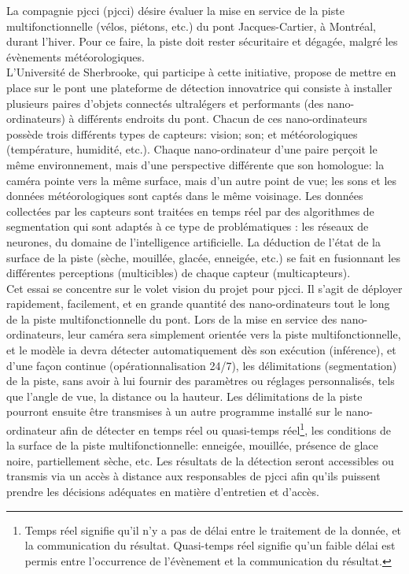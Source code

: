 ﻿\noindent La compagnie \acrlong{pjcci} (\acrshort{pjcci}) désire évaluer la mise en service de la piste multifonctionnelle (vélos, piétons, etc.) du pont Jacques-Cartier, à Montréal, durant l'hiver. Pour ce faire, la piste doit rester sécuritaire et dégagée, malgré les évènements météorologiques.
\vspace{0.5\baselineskip}
\\
\noindent L'Université de Sherbrooke, qui participe à cette initiative, propose de mettre en place sur le pont une plateforme de détection innovatrice qui consiste à installer plusieurs paires d'objets connectés ultralégers et performants (des nano-ordinateurs) à différents endroits du pont. Chacun de ces nano-ordinateurs possède trois différents types de capteurs: vision; son; et météorologiques (température, humidité, etc.). Chaque nano-ordinateur d'une paire perçoit le même environnement, mais d'une perspective différente que son homologue: la caméra pointe vers la même surface, mais d'un autre point de vue; les sons et les données météorologiques sont captés dans le même voisinage. Les données collectées par les capteurs sont traitées en temps réel par des algorithmes de segmentation qui sont adaptés à ce type de problématiques : les réseaux de neurones, du domaine de l'intelligence artificielle. La déduction de l'état de la surface de la piste (sèche, mouillée, glacée, enneigée, etc.) se fait en fusionnant les différentes perceptions (multicibles) de chaque capteur (multicapteurs).
\vspace{0.5\baselineskip}
\\
\noindent Cet essai se concentre sur le volet vision du projet pour \acrshort{pjcci}. Il s'agit de déployer rapidement, facilement, et en grande quantité  des nano-ordinateurs tout le long de la piste multifonctionnelle du pont. Lors de la mise en service des nano-ordinateurs, leur caméra sera simplement orientée vers la piste multifonctionnelle, et le modèle \acrshort{ia} devra détecter automatiquement dès son exécution (inférence), et d'une façon continue (opérationnalisation 24/7), les délimitations (segmentation) de la piste, sans avoir à lui fournir des paramètres ou réglages personnalisés, tels que l'angle de vue, la distance ou la hauteur. Les délimitations de la piste pourront ensuite être transmises à un autre programme installé sur le nano-ordinateur afin de détecter en temps réel ou quasi-temps réel\footnote{Temps réel signifie qu'il n'y a pas de délai entre le traitement de la donnée, et la communication du résultat. Quasi-temps réel signifie qu'un faible délai est permis entre l'occurrence de l'évènement et la communication du résultat.}, les conditions de la surface de la piste multifonctionnelle: enneigée, mouillée, présence de glace noire, partiellement sèche, etc. Les résultats de la détection seront accessibles ou transmis via un accès à distance aux responsables de \acrshort{pjcci} afin qu'ils puissent prendre les décisions adéquates en matière d'entretien et d'accès. 
